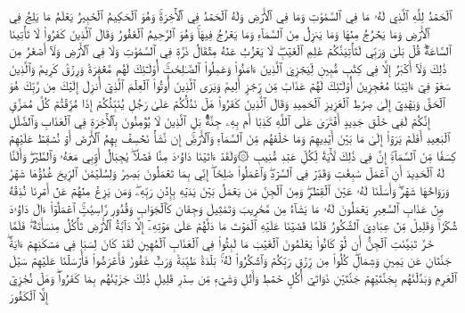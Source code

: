 ٱلۡحَمۡدُ لِلَّهِ ٱلَّذِي لَهُۥ مَا فِي ٱلسَّمَٰوَٰتِ وَمَا فِي ٱلۡأَرۡضِ وَلَهُ ٱلۡحَمۡدُ فِي ٱلۡأٓخِرَةِۚ وَهُوَ ٱلۡحَكِيمُ ٱلۡخَبِيرُ
يَعۡلَمُ مَا يَلِجُ فِي ٱلۡأَرۡضِ وَمَا يَخۡرُجُ مِنۡهَا وَمَا يَنزِلُ مِنَ ٱلسَّمَآءِ وَمَا يَعۡرُجُ فِيهَاۚ وَهُوَ ٱلرَّحِيمُ ٱلۡغَفُورُ
وَقَالَ ٱلَّذِينَ كَفَرُواْ لَا تَأۡتِينَا ٱلسَّاعَةُۖ قُلۡ بَلَىٰ وَرَبِّي لَتَأۡتِيَنَّكُمۡ عَٰلِمِ ٱلۡغَيۡبِۖ لَا يَعۡزُبُ عَنۡهُ مِثۡقَالُ ذَرَّةٖ فِي ٱلسَّمَٰوَٰتِ وَلَا فِي ٱلۡأَرۡضِ وَلَآ أَصۡغَرُ مِن ذَٰلِكَ وَلَآ أَكۡبَرُ إِلَّا فِي كِتَٰبٖ مُّبِينٖ
لِّيَجۡزِيَ ٱلَّذِينَ ءَامَنُواْ وَعَمِلُواْ ٱلصَّـٰلِحَٰتِۚ أُوْلَـٰٓئِكَ لَهُم مَّغۡفِرَةٞ وَرِزۡقٞ كَرِيمٞ
وَٱلَّذِينَ سَعَوۡ فِيٓ ءَايَٰتِنَا مُعَٰجِزِينَ أُوْلَـٰٓئِكَ لَهُمۡ عَذَابٞ مِّن رِّجۡزٍ أَلِيمٞ
وَيَرَى ٱلَّذِينَ أُوتُواْ ٱلۡعِلۡمَ ٱلَّذِيٓ أُنزِلَ إِلَيۡكَ مِن رَّبِّكَ هُوَ ٱلۡحَقَّ وَيَهۡدِيٓ إِلَىٰ صِرَٰطِ ٱلۡعَزِيزِ ٱلۡحَمِيدِ
وَقَالَ ٱلَّذِينَ كَفَرُواْ هَلۡ نَدُلُّكُمۡ عَلَىٰ رَجُلٖ يُنَبِّئُكُمۡ إِذَا مُزِّقۡتُمۡ كُلَّ مُمَزَّقٍ إِنَّكُمۡ لَفِي خَلۡقٖ جَدِيدٍ
أَفۡتَرَىٰ عَلَى ٱللَّهِ كَذِبًا أَم بِهِۦ جِنَّةُۢۗ بَلِ ٱلَّذِينَ لَا يُؤۡمِنُونَ بِٱلۡأٓخِرَةِ فِي ٱلۡعَذَابِ وَٱلضَّلَٰلِ ٱلۡبَعِيدِ
أَفَلَمۡ يَرَوۡاْ إِلَىٰ مَا بَيۡنَ أَيۡدِيهِمۡ وَمَا خَلۡفَهُم مِّنَ ٱلسَّمَآءِ وَٱلۡأَرۡضِۚ إِن نَّشَأۡ نَخۡسِفۡ بِهِمُ ٱلۡأَرۡضَ أَوۡ نُسۡقِطۡ عَلَيۡهِمۡ كِسَفٗا مِّنَ ٱلسَّمَآءِۚ إِنَّ فِي ذَٰلِكَ لَأٓيَةٗ لِّكُلِّ عَبۡدٖ مُّنِيبٖ
۞وَلَقَدۡ ءَاتَيۡنَا دَاوُۥدَ مِنَّا فَضۡلٗاۖ يَٰجِبَالُ أَوِّبِي مَعَهُۥ وَٱلطَّيۡرَۖ وَأَلَنَّا لَهُ ٱلۡحَدِيدَ
أَنِ ٱعۡمَلۡ سَٰبِغَٰتٖ وَقَدِّرۡ فِي ٱلسَّرۡدِۖ وَٱعۡمَلُواْ صَٰلِحًاۖ إِنِّي بِمَا تَعۡمَلُونَ بَصِيرٞ
وَلِسُلَيۡمَٰنَ ٱلرِّيحَ غُدُوُّهَا شَهۡرٞ وَرَوَاحُهَا شَهۡرٞۖ وَأَسَلۡنَا لَهُۥ عَيۡنَ ٱلۡقِطۡرِۖ وَمِنَ ٱلۡجِنِّ مَن يَعۡمَلُ بَيۡنَ يَدَيۡهِ بِإِذۡنِ رَبِّهِۦۖ وَمَن يَزِغۡ مِنۡهُمۡ عَنۡ أَمۡرِنَا نُذِقۡهُ مِنۡ عَذَابِ ٱلسَّعِيرِ
يَعۡمَلُونَ لَهُۥ مَا يَشَآءُ مِن مَّحَٰرِيبَ وَتَمَٰثِيلَ وَجِفَانٖ كَٱلۡجَوَابِ وَقُدُورٖ رَّاسِيَٰتٍۚ ٱعۡمَلُوٓاْ ءَالَ دَاوُۥدَ شُكۡرٗاۚ وَقَلِيلٞ مِّنۡ عِبَادِيَ ٱلشَّكُورُ
فَلَمَّا قَضَيۡنَا عَلَيۡهِ ٱلۡمَوۡتَ مَا دَلَّهُمۡ عَلَىٰ مَوۡتِهِۦٓ إِلَّا دَآبَّةُ ٱلۡأَرۡضِ تَأۡكُلُ مِنسَأَتَهُۥۖ فَلَمَّا خَرَّ تَبَيَّنَتِ ٱلۡجِنُّ أَن لَّوۡ كَانُواْ يَعۡلَمُونَ ٱلۡغَيۡبَ مَا لَبِثُواْ فِي ٱلۡعَذَابِ ٱلۡمُهِينِ
لَقَدۡ كَانَ لِسَبَإٖ فِي مَسۡكَنِهِمۡ ءَايَةٞۖ جَنَّتَانِ عَن يَمِينٖ وَشِمَالٖۖ كُلُواْ مِن رِّزۡقِ رَبِّكُمۡ وَٱشۡكُرُواْ لَهُۥۚ بَلۡدَةٞ طَيِّبَةٞ وَرَبٌّ غَفُورٞ
فَأَعۡرَضُواْ فَأَرۡسَلۡنَا عَلَيۡهِمۡ سَيۡلَ ٱلۡعَرِمِ وَبَدَّلۡنَٰهُم بِجَنَّتَيۡهِمۡ جَنَّتَيۡنِ ذَوَاتَيۡ أُكُلٍ خَمۡطٖ وَأَثۡلٖ وَشَيۡءٖ مِّن سِدۡرٖ قَلِيلٖ
ذَٰلِكَ جَزَيۡنَٰهُم بِمَا كَفَرُواْۖ وَهَلۡ نُجَٰزِيٓ إِلَّا ٱلۡكَفُورَ
